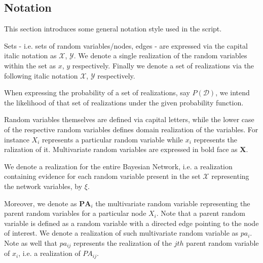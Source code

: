 \documentclass[11pt]{article}
\begin{document}
\begin{article}

\newpage

\tableofcontents

\newpage

\listoffigures
\listofalgorithms
\listoftables

\newpage

\section*{Notation}
This section introduces some general notation style used in the script.

Sets - i.e. sets of random variables/nodes, edges - are expressed via
the capital italic notation as \(\mathscr{X}\), \(\mathscr{Y}\). We denote
a single realization of the random variables within the set as \(x\),
\(y\) respectively. Finally we denote a set of realizations via the
following italic notation \(\mathcal{X}\), \(\mathcal{Y}\) respectively.

When expressing the probability of a set of realizations, say
\(P(\mathcal{D})\), we intend the likelihood of that set of realizations
under the given probability function.

Random variables themselves are defined via capital letters, while the
lower case of the respective random variables defines domain
realization of the variables.  For instance \(X_i\) represents
a particular random variable while \(x_i\) represents the ralization of
it. Multivariate random variables are expressed in bold face as \(\textbf{X}\).

We denote a realization for the entire Bayesian Network, i.e. a
realization containing evidence for each random variable present in
the set \(\mathscr{X}\) representing the network variables, by \(\xi\).

Moreover, we denote as \(\textbf{PA}_i\) the multivariate random
variable representing the parent random variables for a particular
node \(X_i\). Note that a parent random variable is defined as a random
variable with a directed edge pointing to the node of interest. We
denote a realization of such multivariate random variable as \(pa_i\). Note as well
that \(pa_{ij}\) represents the realization of the \(jth\) parent random
variable of \(x_i\), i.e. a realization of \(PA_{ij}\).


\end{article}
\end{document}
